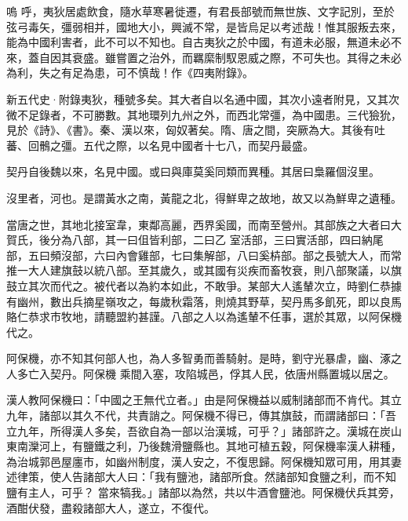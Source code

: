 
\begin{pinyinscope}

 嗚
 呼，夷狄居處飲食，隨水草寒暑徙遷，有君長部號而無世族、文字記別，至於弦弓毒矢，彊弱相并，國地大小，興滅不常，是皆烏足以考述哉！惟其服叛去來，能為中國利害者，此不可以不知也。自古夷狄之於中國，有道未必服，無道未必不來，蓋自因其衰盛。雖嘗置之治外，而羈縻制馭恩威之際，不可失也。其得之未必為利，失之有足為患，可不慎哉！作《四夷附錄》。



 新五代史·附錄夷狄，種號多矣。其大者自以名通中國，其次小遠者附見，又其次微不足錄者，不可勝數。其地環列九州之外，而西北常彊，為中國患。三代獫狁，見於《詩》、《書》。秦、漢以來，匈奴著矣。隋、唐之間，突厥為大。其後有吐蕃、回鶻之彊。五代之際，以名見中國者十七八，而契丹最盛。



 契丹自後魏以來，名見中國。或曰與庫莫奚同類而異種。其居曰梟羅個沒里。



 沒里者，河也。是謂黃水之南，黃龍之北，得鮮卑之故地，故又以為鮮卑之遺種。



 當唐之世，其地北接室韋，東鄰高麗，西界奚國，而南至營州。其部族之大者曰大賀氏，後分為八部，其一曰伹皆利部，二曰乙
 室活部，三曰實活部，四曰納尾部，五曰頻沒部，六曰內會雞部，七曰集解部，八曰奚枿部。部之長號大人，而常推一大人建旗鼓以統八部。至其歲久，或其國有災疾而畜牧衰，則八部聚議，以旗鼓立其次而代之。被代者以為約本如此，不敢爭。某部大人遙輦次立，時劉仁恭據有幽州，數出兵摘星嶺攻之，每歲秋霜落，則燒其野草，契丹馬多飢死，即以良馬賂仁恭求市牧地，請聽盟約甚謹。八部之人以為遙輦不任事，選於其眾，以阿保機代之。



 阿保機，亦不知其何部人也，為人多智勇而善騎射。是時，劉守光暴虐，幽、涿之人多亡入契丹。阿保機
 乘間入塞，攻陷城邑，俘其人民，依唐州縣置城以居之。



 漢人教阿保機曰：「中國之王無代立者。」由是阿保機益以威制諸部而不肯代。其立九年，諸部以其久不代，共責誚之。阿保機不得已，傳其旗鼓，而謂諸部曰：「吾立九年，所得漢人多矣，吾欲自為一部以治漢城，可乎？」諸部許之。漢城在炭山東南灤河上，有鹽鐵之利，乃後魏滑鹽縣也。其地可植五穀，阿保機率漢人耕種，為治城郭邑屋廛市，如幽州制度，漢人安之，不復思歸。阿保機知眾可用，用其妻述律策，使人告諸部大人曰：「我有鹽池，諸部所食。然諸部知食鹽之利，而不知鹽有主人，可乎？
 當來犒我。」諸部以為然，共以牛酒會鹽池。阿保機伏兵其旁，酒酣伏發，盡殺諸部大人，遂立，不復代。




\end{pinyinscope}
